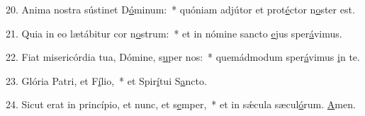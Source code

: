 20. Anima nostra sústinet D\uline{ó}minum:~* quóniam adjútor et prot\uline{é}ctor n\uline{o}ster est.\par 
21. Quia in eo lætábitur cor n\uline{o}strum:~* et in nómine sancto \uline{e}jus sper\uline{á}vimus.\par 
22. Fiat misericórdia tua, Dómine, s\uline{u}per nos:~* quemádmodum sper\uline{á}vimus \uline{i}n te.\par 
23. Glória Patri, et F\uline{í}lio,~* et Spir\uline{í}tui S\uline{a}ncto.\par 
24. Sicut erat in princípio, et nunc, et s\uline{e}mper,~* et in sǽcula sæcul\uline{ó}rum. \uline{A}men.\par 
